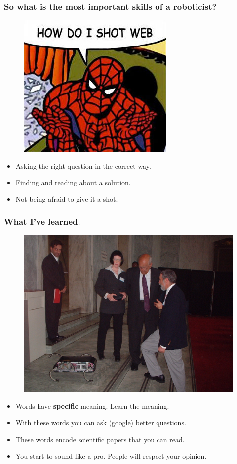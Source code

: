 \documentclass[compress]{beamer}
\begin{document}
\begin{frame}
   \frametitle{So what is the most important skills of a roboticist?}
   \begin{figure}
     \includegraphics[width=0.5\linewidth]{howdoishotweb.jpg}
   \end{figure}

   \begin{itemize}
     \item Asking the right question in the correct way.
     \item Finding and reading about a solution.
     \item Not being afraid to give it a shot.
   \end{itemize}
 \end{frame}
\begin{frame}
   \frametitle{What I've learned.}
   \begin{figure}
     \includegraphics[width=0.5\linewidth]{youngkat.jpg}
   \end{figure}

   \begin{itemize}
     \item Words have \textbf{specific} meaning. Learn the meaning.
     \item With these words you can ask (google) better questions. 
     \item These words encode scientific papers that you can read.
     \item You start to sound like a pro. People will respect your opinion.
   \end{itemize}
 \end{frame}
\end{document}
